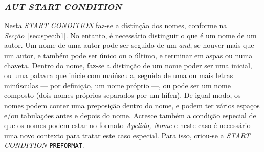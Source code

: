 \subsubsection{\emph{AUT \emph{START CONDITION}}}

Nesta \emph{START CONDITION} faz-se a distinção dos nomes, conforme na
\emph{Secção}~\ref{sec:spec:b1}. No entanto, é necessário distinguir o que é um
nome de um autor. Um nome de uma autor pode-ser seguido de um \emph{and}, se
houver mais que um autor, e também pode ser único ou o último, e terminar em
aspas ou numa chaveta. Dentro do nome, faz-se a distinção de um nome poder ser
uma inicial, ou uma palavra que inicie com maiúscula, seguida de uma ou mais
letras minúsculas --- por definição, um nome próprio ---, ou pode ser um nome
composto (dois nomes próprios separados por um hífen). De igual modo, os nomes
podem conter uma preposição dentro do nome, e podem ter vários espaços e/ou
tabulações antes e depois do nome. Acresce também a condição especial de que os
nomes podem estar no formato \emph{Apelido, Nome} e neste caso é necessário uma novo
contexto para tratar este caso especial. Para isso, criou-se a \emph{START
CONDITION} \texttt{PREFORMAT}. 



